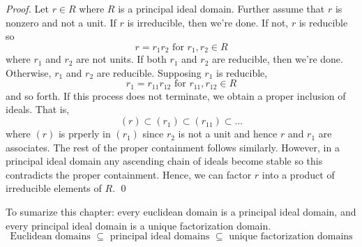 \begin{proof}
    Let $r\in R$ where $R$ is a principal ideal domain. Further assume that $r$ is nonzero and not a unit. If $r$ is irreducible, then we're done. If not, $r$ is reducible so 
    $$r=r_1r_2 \text{ for $r_1,r_2\in R$}$$
    where $r_1$ and $r_2$ are not units. If both $r_1$ and $r_2$ are reducible, then we're done. Otherwise, $r_1$ and $r_2$ are reducible. Supposing $r_1$ is reducible,
    $$r_1 = r_{11}r_{12} \text{ for $r_{11},r_{12}\in R$}$$
    and so forth. If this process does not terminate, we obtain a proper inclusion of ideals. That is,
    $$(r) \subset (r_1) \subset (r_{11}) \subset ...$$
    where $(r)$ is prperly in $(r_1)$ since $r_2$ is not a unit and hence $r$ and $r_1$ are associates. The rest of the proper containment follows similarly. However, in a principal ideal domain any ascending chain of ideals become stable so this contradicts the proper containment. Hence, we can factor $r$ into a product of irreducible elements of $R$.
    \qed
\end{proof}

To sumarize this chapter: every euclidean domain is a principal ideal domain, and every principal ideal domain is a unique factorization domain.
$$\text{Euclidean domains $\subseteq$ principal ideal domains $\subseteq$ unique factorization domains}$$

